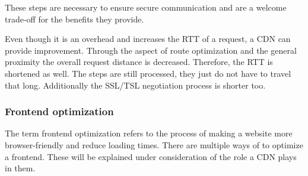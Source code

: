 These steps are necessary to ensure secure communication and are a welcome trade-off for the benefits they provide. 

Even though it is an overhead and increases the RTT of a request, a CDN can provide improvement. Through the aspect of route optimization and the general proximity the overall request distance is decreased. Therefore, the RTT is shortened as well. The steps are still processed, they just do not have to travel that long. Additionally the SSL/TSL negotiation process is shorter too.\cite{cdn_ssl_tsl}

\subsubsection{Frontend optimization}

The term frontend optimization refers to the process of making a website more browser-friendly and reduce loading times. There are multiple ways of to optimize a frontend. These will be explained under consideration of the role a CDN plays in them.

